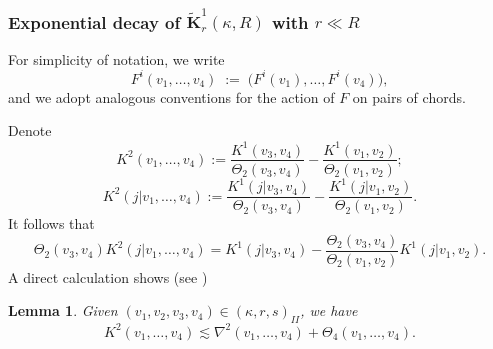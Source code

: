 \documentclass{amsart}
\newtheorem{Lemma}[Definition]{Lemma}
\theoremstyle{definition}
\begin{document}
\subsubsection{Exponential decay of $\widetilde{\mathbf{K}}_r^1(\kappa,R)$ with $r\ll R$}
For simplicity of notation, we write
\[
F^i(v_1,\dots,v_4) \;:=\; \bigl(F^i(v_1),\dots,F^i(v_4)\bigr),
\]
and we adopt analogous conventions for the action of \(F\) on pairs of chords.

Denote
\[K^2(v_1,\ldots,v_4):=\frac{K^1(v_3,v_4)}{\Theta_2(v_3,v_4)}-\frac{K^1(v_1,v_2)}{\Theta_2(v_1,v_2)};\]
\[K^2(j|v_1,\ldots,v_4):=\frac{K^1(j|v_3,v_4)}{\Theta_2(v_3,v_4)}-\frac{K^1(j|v_1,v_2)}{\Theta_2(v_1,v_2)}.\]
It follows that
\begin{equation}\label{sk2}
\Theta_2(v_3,v_4)K^2(j|v_1,\ldots,v_4)=K^1(j|v_3,v_4)-\frac{\Theta_2(v_3,v_4)}{\Theta_2(v_1,v_2)}K^1(j|v_1,v_2).
\end{equation}
A direct calculation shows (see \cite[Proposition 2.3]{KO1})
\begin{Lemma}\label{K22}
Given $(v_1,v_2,v_3,v_4)\in (\kappa,r,s)_{II}$, we have
\[K^2(v_1,\ldots,v_4)\lesssim \nabla^2(v_1,\ldots,v_4)+\Theta_4(v_1,\ldots,v_4).\]
\end{Lemma}
\end{document}
